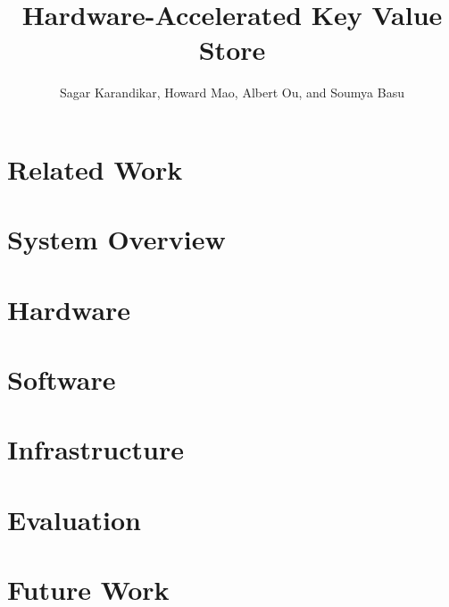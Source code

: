 \documentclass[conference]{IEEEtran}
\title{Hardware-Accelerated Key Value Store}
\author{Sagar Karandikar, Howard Mao, Albert Ou, and Soumya Basu}
\begin{document}
\maketitle





\section{Related Work}



\section{System Overview}



\section{Hardware}




\section{Software}



\section{Infrastructure}



\section{Evaluation}



\section{Future Work}




\nocite{*}
\printbibliography
\end{document}
